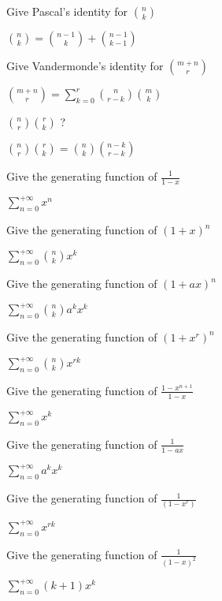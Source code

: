 \documentclass[12pt]{article}
\newcommand*{\xfield}[1]{\begin{mdframed}\centering #1\end{mdframed}\bigskip}
\newenvironment{note}{}{}
\begin{document}
\begin{note}
	\xfield{Give Pascal's identity for $\binom{n}{k}$}
	\xfield{$\binom{n}{k} = \binom{n-1}{k} + \binom{n-1}{k-1}$}
\end{note}

\begin{note}
	\xfield{Give Vandermonde's identity for $\binom{m+n}{r}$}
	\xfield{$\binom{m+n}{r} = \sum\limits^{r}_{k=0} \binom{n}{r-k}\binom{m}{k}$}
\end{note}
\begin{note}
	\xfield{$\binom{n}{r}\binom{r}{k}$ ?}
	\xfield{$\binom{n}{r}\binom{r}{k}=\binom{n}{k}\binom{n-k}{r-k}$}
\end{note}

\begin{note}
	\xfield{Give the generating function of $\frac{1}{1-x}$}
	\xfield{$\sum\limits_{n=0}^{+{\infty}}{x^n}$}
\end{note}

\begin{note}
	\xfield{Give the generating function of $(1+x)^n$}
	\xfield{$\sum\limits_{n=0}^{+{\infty}}{\binom{n}{k}x^k}$}
\end{note}

\begin{note}
	\xfield{Give the generating function of $(1+ax)^n$}
	\xfield{$\sum\limits_{n=0}^{+{\infty}}{\binom{n}{k}a^kx^k}$}
\end{note}

\begin{note}
	\xfield{Give the generating function of $(1+x^r)^n$}
	\xfield{$\sum\limits_{n=0}^{+{\infty}}{\binom{n}{k}x^{rk}}$}
\end{note}

\begin{note}
	\xfield{Give the generating function of $\frac{1-x^{n+1}}{1-x}$}
	\xfield{$\sum\limits_{n=0}^{+{\infty}}{x^k}$}
\end{note}

\begin{note}
	\xfield{Give the generating function of $\frac{1}{1-ax}$}
	\xfield{$\sum\limits_{n=0}^{+{\infty}}{a^kx^k}$}
\end{note}

\begin{note}
	\xfield{Give the generating function of $\frac{1}{(1-x^r)}$}
	\xfield{$\sum\limits_{n=0}^{+{\infty}}{x^{rk}}$}
\end{note}

\begin{note}
	\xfield{Give the generating function of $\frac{1}{(1-x)^2}$}
	\xfield{$\sum\limits_{n=0}^{+{\infty}}{(k+1)x^k}$}
\end{note}
\end{document}
